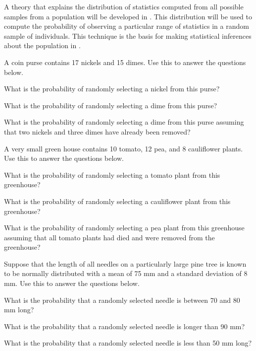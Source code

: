 \documentclass[10pt,openany]{book}\usepackage[]{graphicx}\usepackage[]{color}
\begin{document}
A theory that explains the distribution of statistics computed from all possible samples from a population will be developed in .  This distribution will be used to compute the probability of observing a particular range of statistics in a random sample of individuals.  This technique is the basis for making statistical inferences about the population in .

\begin{exsection}
  \item \label{revex:ProbCoin} A coin purse contains 17 nickels and 15 dimes.  Use this to answer the questions below. 
  \begin{Enumerate}
    \item What is the probability of randomly selecting a nickel from this purse?
    \item What is the probability of randomly selecting a dime from this purse?
    \item What is the probability of randomly selecting a dime from this purse assuming that two nickels and three dimes have already been removed?
  \end{Enumerate}

  \item \label{revex:ProbGHouse} A very small green house contains 10 tomato, 12 pea, and 8 cauliflower plants.  Use this to answer the questions below. 
  \begin{Enumerate}
    \item What is the probability of randomly selecting a tomato plant from this greenhouse?
    \item What is the probability of randomly selecting a cauliflower plant from this greenhouse?
    \item What is the probability of randomly selecting a pea plant from this greenhouse assuming that all tomato plants had died and were removed from the greenhouse?
  \end{Enumerate}

  \item \label{revex:ProbPine} \rhw{} Suppose that the length of all needles on a particularly large pine tree is known to be normally distributed with a mean of 75 mm and a standard deviation of 8 mm.  Use this to answer the questions below. 
  \begin{Enumerate}
    \item What is the probability that a randomly selected needle is between 70 and 80 mm long?
    \item What is the probability that a randomly selected needle is longer than 90 mm?
    \item What is the probability that a randomly selected needle is less than 50 mm long?
  \end{Enumerate}
\end{exsection}
\end{document}
